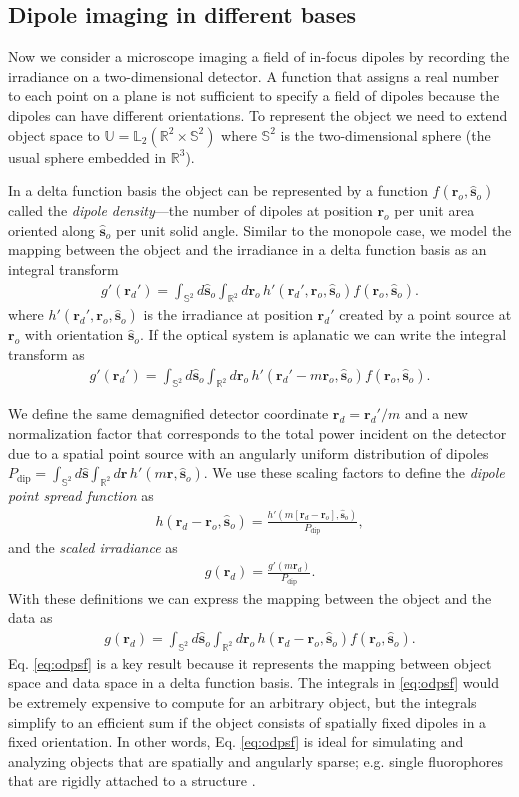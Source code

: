 \documentclass[]{osa-article}
\providecommand{\mb}[1]{\mathbf{#1}}
\providecommand{\ro}{\mathbf{\mathbf{r}}_o}
\providecommand{\so}{\mathbf{\hat{s}}_o}
\providecommand{\rd}{\mathbf{r}_d}
\providecommand{\mh}[1]{\mathbf{\hat{#1}}}
\providecommand{\mbb}[1]{\mathbb{#1}}
\begin{document}
\subsection{Dipole imaging in different bases}\label{sec:dipole}
Now we consider a microscope imaging a field of in-focus dipoles by recording
the irradiance on a two-dimensional detector. A function that assigns a real
number to each point on a plane is not sufficient to specify a field of dipoles
because the dipoles can have different orientations. To represent the object we
need to extend object space to $\mbb{U} = \mbb{L}_2(\mbb{R}^2\times\mbb{S}^2)$
where $\mbb{S}^2$ is the two-dimensional sphere (the usual sphere embedded in
$\mbb{R}^3$).

In a delta function basis the object can be represented by a function
$f(\ro, \so)$ called the \textit{dipole density}---the number of dipoles at
position $\ro{}$ per unit area oriented along $\so{}$ per unit solid angle.
Similar to the monopole case, we model the mapping between the object and the
irradiance in a delta function basis as an integral transform
\begin{align}
  g'(\rd') = \int_{\mbb{S}^2}d\so\int_{\mbb{R}^2}d\ro\, h'(\rd', \ro, \so)f(\ro, \so). 
\end{align}
where $h'(\rd', \ro, \so)$ is the irradiance at position $\rd'$ created by a
point source at $\ro$ with orientation $\so$. If the optical system is aplanatic
we can write the integral transform as
\begin{align}
  g'(\rd') = \int_{\mbb{S}^2}d\so\int_{\mbb{R}^2}d\ro\, h'(\rd' - m\ro, \so)f(\ro, \so). 
\end{align}

We define the same demagnified detector coordinate $\rd = \rd'/m$ and a new
normalization factor that corresponds to the total power incident on the
detector due to a spatial point source with an angularly uniform distribution of
dipoles
$P_\text{dip} = \int_{\mbb{S}^2}d\mh{s}\int_{\mbb{R}^2}d\mb{r}\, h'(m\mb{r},
\so)$. We use these scaling factors to define the
\textit{dipole point spread function} as
\begin{align}
  h(\rd - \ro, \so) = \frac{h'(m[\rd - \ro], \so)}{P_\text{dip}}, 
\end{align}
and the \textit{scaled irradiance} as 
\begin{align}
  g(\rd) = \frac{g'(m\rd)}{P_\text{dip}}. 
\end{align}
With these definitions we can express the mapping between the object and the
data as
\begin{align}
g(\rd{}) = \int_{\mbb{S}^2}d\so{}\int_{\mbb{R}^2}d\ro{}\, h(\rd{} -\ro{}, \so{})f(\ro, \so). \label{eq:odpsf}
\end{align}
Eq. \ref{eq:odpsf} is a key result because it represents the mapping between
object space and data space in a delta function basis. The integrals in
\ref{eq:odpsf} would be extremely expensive to compute for an arbitrary object,
but the integrals simplify to an efficient sum if the object consists of
spatially fixed dipoles in a fixed orientation. In other words, Eq.
\ref{eq:odpsf} is ideal for simulating and analyzing objects that are spatially
and angularly sparse; e.g. single fluorophores that are rigidly attached to a
structure .
\end{document}
